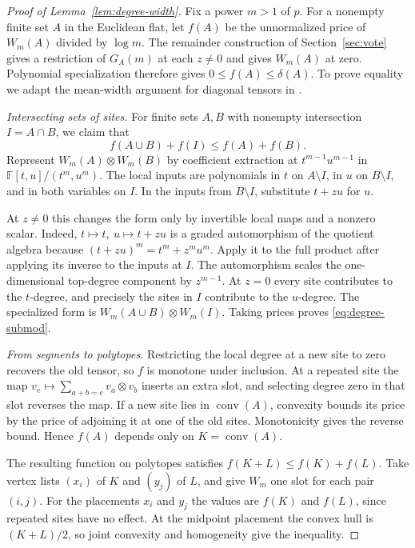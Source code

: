 \begin{proof}[Proof of Lemma~\ref{lem:degree-width}]
Fix a power \(m>1\) of \(p\). For a nonempty finite set \(A\) in the
Euclidean flat, let \(f(A)\) be the unnormalized price of \(W_m(A)\)
divided by \(\log m\). The remainder construction of Section~\ref{sec:vote} gives a restriction
of \(G_A(m)\) at each \(z\ne0\) and gives \(W_m(A)\) at zero. Polynomial
specialization therefore gives \(0\le f(A)\le\delta(A)\). To prove equality we adapt the mean-width
argument for diagonal tensors in \cite[proof of Theorem~]{oaG}.

\emph{Intersecting sets of sites.}
For finite sets \(A,B\) with nonempty intersection \(I=A\cap B\), we
claim that
\begin{equation}\label{eq:degree-submod}
                 f(A\cup B)+f(I)\le f(A)+f(B).
\end{equation}
Represent \(W_m(A)\otimes W_m(B)\) by coefficient extraction at
\(t^{m-1}u^{m-1}\) in \(\mathbb F[t,u]/(t^m,u^m)\). The local
inputs are polynomials in \(t\) on \(A\setminus I\), in \(u\) on
\(B\setminus I\), and in both variables on \(I\). In the inputs from
\(B\setminus I\), substitute \(t+zu\) for \(u\).

At \(z\ne0\) this changes the form only by invertible local maps and a
nonzero scalar. Indeed, \(t\mapsto t,\ u\mapsto t+zu\) is a graded
automorphism of the quotient algebra because
\((t+zu)^m=t^m+z^m u^m\). Apply it to the full product after applying
its inverse to the inputs at \(I\). The automorphism scales the
one-dimensional top-degree component by \(z^{m-1}\).
At \(z=0\) every site contributes to the \(t\)-degree, and precisely
the sites in \(I\) contribute to the \(u\)-degree. The specialized
form is \(W_m(A\cup B)\otimes W_m(I)\). Taking prices proves
\eqref{eq:degree-submod}.

\emph{From segments to polytopes.}
Restricting the local degree at a new site to zero recovers the old
tensor, so \(f\) is monotone under inclusion. At a repeated site the
map \(v_e\mapsto\sum_{a+b=e} v_a\otimes v_b\) inserts an extra slot,
and selecting degree zero in that slot reverses the map. If a new
site lies in \(\operatorname{conv}(A)\), convexity bounds its price
by the price of adjoining it at one of the old sites. Monotonicity
gives the reverse bound. Hence \(f(A)\) depends only on
\(K=\operatorname{conv}(A)\).

The resulting function on polytopes satisfies
\(f(K+L)\le f(K)+f(L)\). Take vertex lists \((x_i)\) of \(K\) and
\((y_j)\) of \(L\), and give \(W_m\) one slot for each pair \((i,j)\).
For the placements \(x_i\) and \(y_j\) the values are \(f(K)\) and
\(f(L)\), since repeated sites have no effect. At the midpoint
placement the convex hull is \((K+L)/2\), so joint convexity and
homogeneity give the inequality.


\end{proof}
